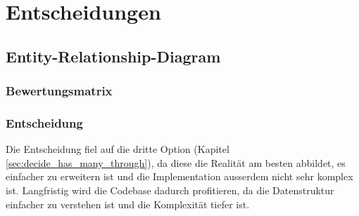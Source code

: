 \section{Entscheidungen}
\begin{minipage}{\textwidth}
    \subsection{Entity-Relationship-Diagram}
    \subsubsection{Bewertungsmatrix}
    \begin{center}
    \end{center}
    \subsubsection{Entscheidung}
    Die Entscheidung fiel auf die dritte Option (Kapitel \ref{sec:decide_has_many_through}), da diese die Realität am besten
    abbildet, es einfacher zu erweitern ist und die Implementation ausserdem nicht sehr komplex ist. \newline
    Langfristig wird die Codebase dadurch profitieren, da die Datenstruktur einfacher zu verstehen ist und die Komplexität
    tiefer ist. \newline
\end{minipage}

